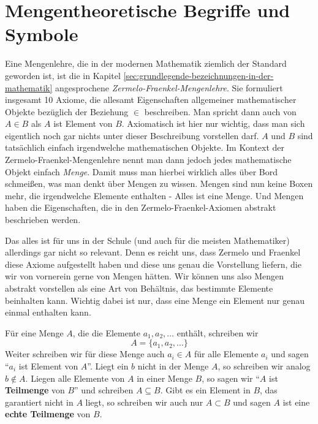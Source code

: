 \begin{definition} %
    
\end{definition}

\section{Mengentheoretische Begriffe und Symbole}
Eine Mengenlehre, die in der modernen Mathematik ziemlich der Standard geworden ist, ist die in Kapitel \ref{sec:grundlegende-bezeichnungen-in-der-mathematik} angesprochene \textit{Zermelo-Fraenkel-Mengenlehre}. Sie formuliert insgesamt 10 Axiome, die allesamt Eigenschaften allgemeiner mathematischer Objekte bezüglich der Beziehung \(\in\) beschreiben. Man spricht dann auch von \(A \in B\) als \(A\) ist Element von \(B\). Axiomatisch ist hier nur wichtig, dass man sich eigentlich noch gar nichts unter dieser Beschreibung vorstellen darf. \(A\) und \(B\) sind tatsächlich einfach irgendwelche mathematischen Objekte. Im Kontext der Zermelo-Fraenkel-Mengenlehre nennt man dann jedoch jedes mathematische Objekt einfach \textit{Menge}. Damit muss man hierbei wirklich alles über Bord schmeißen, was man denkt über Mengen zu wissen. Mengen sind nun keine Boxen mehr, die irgendwelche Elemente enthalten - Alles ist eine Menge. Und Mengen haben die Eigenschaften, die in den Zermelo-Fraenkel-Axiomen abstrakt beschrieben werden. 

Das alles ist für uns in der Schule (und auch für die meisten Mathematiker) allerdings gar nicht so relevant. Denn es reicht uns, dass Zermelo und Fraenkel diese Axiome aufgestellt haben und diese uns genau die Vorstellung liefern, die wir von vornerein gerne von Mengen hätten. Wir können uns also Mengen abstrakt vorstellen als eine Art von Behältnis, das bestimmte Elemente beinhalten kann. Wichtig dabei ist nur, dass eine Menge ein Element nur genau einmal enthalten kann. 

\begin{definition}
    Für eine Menge \(A\), die die Elemente \(a_1, a_2 , \dots\) enthält, schreiben wir 
    \begin{equation*}
        A = \{a_1, a_2, \dots \}
    \end{equation*}
    Weiter schreiben wir für diese Menge auch \(a_i \in A\) für alle Elemente \(a_i\) und sagen "`\(a_i\) ist Element von \(A\)"'. Liegt ein \(b\) nicht in der Menge \(A\), so schreiben wir analog \(b \notin A\). Liegen alle Elemente von \(A\) in einer Menge \(B\), so sagen wir "`\(A\) ist \textbf{Teilmenge} von \(B\)"' und schreiben \(A \subseteq B\). Gibt es ein Element in \(B\), das garantiert nicht in \(A\) liegt, so schreiben wir auch nur \(A \subset B\) und sagen \(A\) ist eine \textbf{echte Teilmenge} von \(B\). 
\end{definition}

